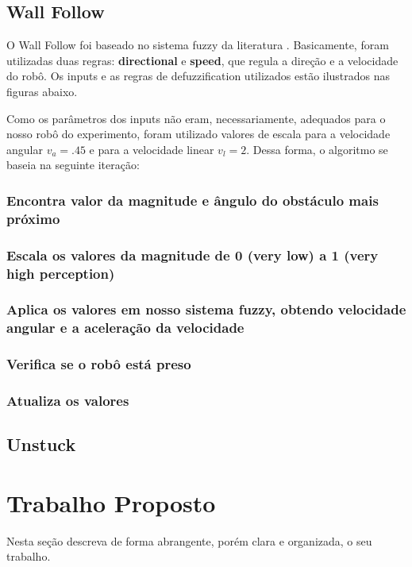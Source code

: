 \documentclass[twoside,conference,a4paper]{IEEEtran}
\begin{document}
\subsection{Wall Follow}

O Wall Follow foi baseado no sistema fuzzy da literatura \cite{Reinhard:1995}. Basicamente, foram utilizadas duas regras: \textbf{directional} e \textbf{speed}, que regula a direção e a velocidade do robô. Os inputs e as regras de  defuzzification utilizados estão ilustrados nas figuras abaixo.

Como os parâmetros dos inputs não eram, necessariamente, adequados para o nosso robô do experimento, foram utilizado valores de escala para a velocidade angular $v_{a} = .45$ e para a velocidade linear $v_{l} = 2$. Dessa forma, o algoritmo se baseia na seguinte iteração:

  \subsubsection{Encontra valor da magnitude e ângulo do obstáculo mais próximo}
  \subsubsection{Escala os valores da magnitude de 0 (very low) a 1 (very high perception)}
  \subsubsection{Aplica os valores em nosso sistema fuzzy, obtendo velocidade angular e a aceleração da velocidade}
  \subsubsection{Verifica se o robô está preso}
  \subsubsection{Atualiza os valores}


\subsection{Unstuck}

\section{Trabalho Proposto}

Nesta seção descreva de forma abrangente, porém clara e organizada, o seu trabalho.
\end{document}
